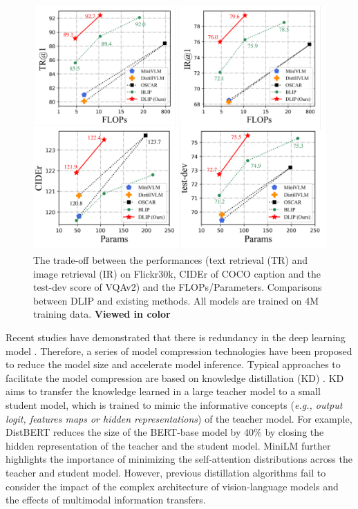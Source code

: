 \documentclass[10pt,twocolumn,letterpaper]{article}
\begin{document}
\begin{figure}[t]
  \centering
  \centerline{\includegraphics[width=\columnwidth]{imgs/trades.pdf}}
  \caption{ The trade-off between the performances (text retrieval
(TR) and image retrieval (IR) on Flickr30k, CIDEr of COCO caption and the test-dev score of VQAv2) and the FLOPs/Parameters. Comparisons between DLIP and existing methods. All models are trained on 4M training data. 
\textbf{Viewed in color}}
\label{trades}
  \vskip -0.2in
\end{figure}

Recent studies have demonstrated that there is redundancy in the deep learning model \cite{li2016pruning, molchanov2016pruning, he2017channel}. 
Therefore, a series of model compression technologies have been proposed to reduce the model size and accelerate model inference. 
Typical approaches to facilitate the model compression are based on knowledge distillation (KD) \cite{hinton2015distilling, polino2018model, sun2019patient, sanh2019distilbert}.
KD aims to transfer the knowledge learned in a large teacher model to a small student model,  which is trained to mimic the informative concepts (\emph{e.g., output logit, features maps or hidden representations}) of the teacher model. 
For example, DistBERT \cite{sanh2019distilbert} reduces the size of the BERT-base model by 40\% by closing the hidden representation of the teacher and the student model.
MiniLM \cite{wang2020minilm} further highlights the importance of minimizing the self-attention distributions across the teacher and student model. 
However, previous distillation algorithms fail to consider the impact of the complex architecture of vision-language models and the effects of multimodal information transfers.
\end{document}
